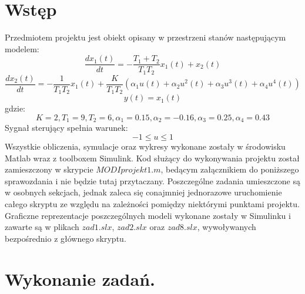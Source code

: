 \section{Wstęp}
Przedmiotem projektu jest obiekt opisany w przestrzeni stanów następującym modelem:
\begin{equation}
\frac{dx_{1}(t)}{dt} = -\frac{T_{1}+T_{2}}{T_{1}T_{2}}x_{1}(t) + x_{2}(t)
\end{equation}
\begin{equation}
\frac{dx_{2}(t)}{dt} = -\frac{1}{T_{1}T_{2}}x_{1}(t) + \frac{K}{T_{1}T_{2}}(\alpha_{1}u(t) + \alpha_{2}u^2(t) + \alpha_{3}u^3(t) + \alpha_{4}u^4(t))
\end{equation}
\begin{equation}
y(t)=x_{1}(t)
\end{equation}
gdzie: $$K = 2, T_{1} = 9, T_{2} = 6, \alpha_{1} = 0.15, \alpha_{2} = -0.16, \alpha_{3} = 0.25, \alpha_{4} = 0.43$$ Sygnał sterujący spełnia warunek:
\begin{equation}
-1\leq u \leq 1
\end{equation}
Wszystkie obliczenia, symulacje oraz wykresy wykonane zostały w środowisku Matlab wraz z toolboxem Simulink. Kod służący do wykonywania projektu został zamieszczony w skrypcie $MODIprojekt1.m$, bedącym załącznikiem do poniższego sprawozdania i nie będzie tutaj przytaczany. Poszczególne zadania umieszczone są w osobnych sekcjach, jednak zaleca się conajmniej jednorazowe uruchomienie całego skryptu ze względu na zależności pomiędzy niektórymi punktami projektu. Graficzne reprezentacje poszczególnych modeli wykonane zostały w Simulinku i zawarte są w plikach $zad1.slx$, $zad2.slx$ oraz $zad8.slx$, wywoływanych bezpośrednio z głównego skryptu.
\section{Wykonanie zadań.}
